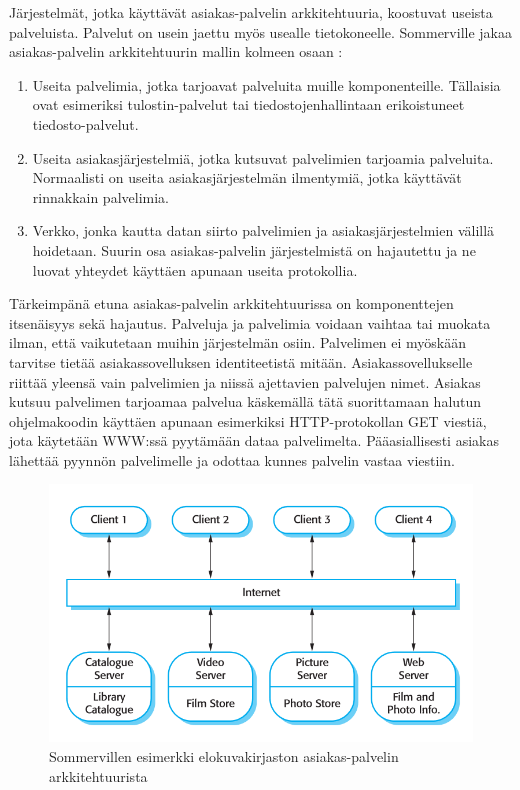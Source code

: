\documentclass[utf8]{gradu3}
\begin{document}
Järjestelmät, jotka käyttävät asiakas-palvelin arkkitehtuuria, koostuvat useista palveluista. Palvelut on usein jaettu myös usealle tietokoneelle. Sommerville jakaa asiakas-palvelin arkkitehtuurin mallin kolmeen osaan \parencite[s. 161]{Sommerville}: 

\begin{enumerate}  
\item Useita palvelimia, jotka tarjoavat palveluita muille komponenteille. Tällaisia ovat esimeriksi tulostin-palvelut tai tiedostojenhallintaan erikoistuneet tiedosto-palvelut.
\item Useita asiakasjärjestelmiä, jotka kutsuvat palvelimien tarjoamia palveluita. Normaalisti on useita asiakasjärjestelmän ilmentymiä, jotka käyttävät rinnakkain palvelimia.
\item Verkko, jonka kautta datan siirto palvelimien ja asiakasjärjestelmien välillä hoidetaan. Suurin osa asiakas-palvelin järjestelmistä on hajautettu ja ne luovat yhteydet käyttäen apunaan useita protokollia.
\end{enumerate}

Tärkeimpänä etuna asiakas-palvelin arkkitehtuurissa on komponenttejen itsenäisyys sekä hajautus. Palveluja ja palvelimia voidaan vaihtaa tai muokata ilman, että vaikutetaan muihin järjestelmän osiin. Palvelimen ei myöskään tarvitse tietää asiakassovelluksen identiteetistä mitään. Asiakassovellukselle riittää yleensä vain palvelimien ja niissä ajettavien palvelujen nimet. Asiakas kutsuu palvelimen tarjoamaa palvelua käskemällä tätä suorittamaan halutun ohjelmakoodin käyttäen apunaan esimerkiksi HTTP-protokollan GET viestiä, jota käytetään WWW:ssä pyytämään dataa palvelimelta. Pääasiallisesti asiakas lähettää pyynnön palvelimelle ja odottaa kunnes palvelin vastaa viestiin.

\begin{figure}[h]
\centering
\includegraphics[scale=0.85]{clientserver.png}
\caption{Sommervillen esimerkki elokuvakirjaston asiakas-palvelin arkkitehtuurista \parencite[s.162]{Sommerville}}
\end{figure}
\end{document}
